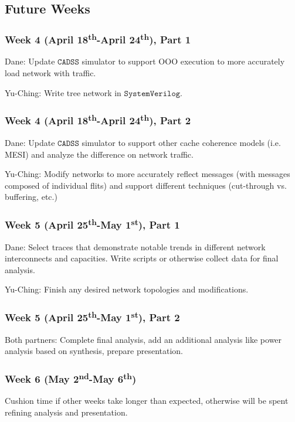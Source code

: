\documentclass{article}
\begin{document}
    \subsection{Future Weeks}
    \subsubsection*{Week 4 (April 18\textsuperscript{th}-April 24\textsuperscript{th}), Part 1} 
    Dane: Update $\texttt{CADSS}$ simulator to support OOO execution to more accurately load network with traffic. 
    
    Yu-Ching: Write tree network in $\texttt{SystemVerilog}$. %
    \subsubsection*{Week 4 (April 18\textsuperscript{th}-April 24\textsuperscript{th}), Part 2} 
    Dane: Update $\texttt{CADSS}$ simulator to support other cache coherence models (i.e. MESI) and analyze the difference on network traffic. %
    
    Yu-Ching: Modify networks to more accurately reflect messages (with messages composed of individual flits) and support different techniques (cut-through vs. buffering, etc.)  %
    \subsubsection*{Week 5 (April 25\textsuperscript{th}-May 1\textsuperscript{st}), Part 1} 
    Dane: Select traces that demonstrate notable trends in different network interconnects and capacities. Write scripts or otherwise collect data for final analysis.%
    
    Yu-Ching: Finish any desired network topologies and modifications. 
    \subsubsection*{Week 5 (April 25\textsuperscript{th}-May 1\textsuperscript{st}), Part 2} 
    Both partners: Complete final analysis, add an additional analysis like power analysis based on synthesis, prepare presentation. 
    \subsubsection*{Week 6 (May 2\textsuperscript{nd}-May 6\textsuperscript{th})} 
    Cushion time if other weeks take longer than expected, otherwise will be spent refining analysis and presentation. 
\end{document}
